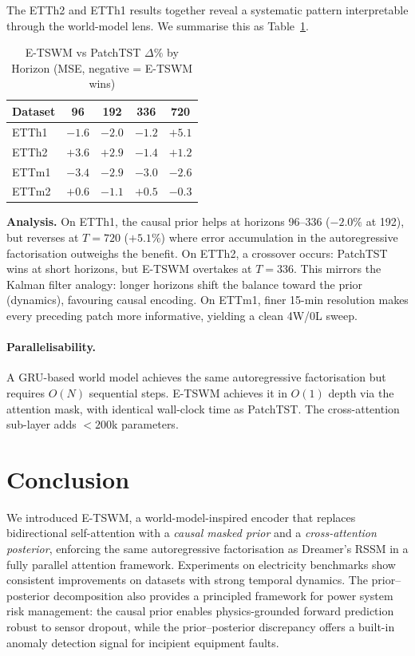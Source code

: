 \documentclass[conference]{IEEEtran}
\begin{document}
The ETTh2 and ETTh1 results together reveal a systematic pattern interpretable through the world-model lens. We summarise this as Table~\ref{tab:horizon}.

\begin{table}[htbp]
\caption{E-TSWM vs PatchTST $\Delta$\% by Horizon (MSE, negative = E-TSWM wins)}
\begin{center}
{\small
\begin{tabular}{lcccc}
\toprule
Dataset & 96 & 192 & 336 & 720 \\
\midrule
ETTh1 & $-1.6$ & $-2.0$ & $-1.2$ & $+5.1$ \\
ETTh2 & $+3.6$ & $+2.9$ & $\mathbf{-1.4}$ & $+1.2$ \\
ETTm1 & $\mathbf{-3.4}$ & $-2.9$ & $-3.0$ & $-2.6$ \\
ETTm2 & $+0.6$ & $-1.1$ & $+0.5$ & $-0.3$ \\
\bottomrule
\end{tabular}
}
\label{tab:horizon}
\end{center}
\end{table}

\textbf{Analysis.} On ETTh1, the causal prior helps at horizons 96--336 ($-2.0\%$ at 192), but reverses at $T{=}720$ ($+5.1\%$) where error accumulation in the autoregressive factorisation outweighs the benefit. On ETTh2, a crossover occurs: PatchTST wins at short horizons, but E-TSWM overtakes at $T{=}336$. This mirrors the Kalman filter analogy: longer horizons shift the balance toward the prior (dynamics), favouring causal encoding. On ETTm1, finer 15-min resolution makes every preceding patch more informative, yielding a clean 4W/0L sweep.

\paragraph{Parallelisability.}
A GRU-based world model achieves the same autoregressive factorisation but requires $O(N)$ sequential steps. E-TSWM achieves it in $O(1)$ depth via the attention mask, with identical wall-clock time as PatchTST. The cross-attention sub-layer adds $<200$k parameters.

\section{Conclusion}

We introduced E-TSWM, a world-model-inspired encoder that replaces bidirectional self-attention with a \emph{causal masked prior} and a \emph{cross-attention posterior}, enforcing the same autoregressive factorisation as Dreamer's RSSM in a fully parallel attention framework. Experiments on electricity benchmarks show consistent improvements on datasets with strong temporal dynamics. The prior--posterior decomposition also provides a principled framework for power system risk management: the causal prior enables physics-grounded forward prediction robust to sensor dropout, while the prior--posterior discrepancy offers a built-in anomaly detection signal for incipient equipment faults.
\end{document}
